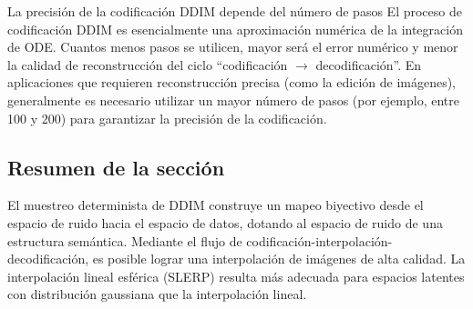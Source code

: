 \begin{warningbox}{La precisión de la codificación DDIM depende del número de pasos}
El proceso de codificación DDIM es esencialmente una aproximación numérica de la integración de ODE. Cuantos menos pasos se utilicen, mayor será el error numérico y menor la calidad de reconstrucción del ciclo ``codificación $\to$ decodificación''. En aplicaciones que requieren reconstrucción precisa (como la edición de imágenes), generalmente es necesario utilizar un mayor número de pasos (por ejemplo, entre 100 y 200) para garantizar la precisión de la codificación.
\end{warningbox}

\subsection{Resumen de la sección}

El muestreo determinista de DDIM construye un mapeo biyectivo desde el espacio de ruido hacia el espacio de datos, dotando al espacio de ruido de una estructura semántica. Mediante el flujo de codificación-interpolación-decodificación, es posible lograr una interpolación de imágenes de alta calidad. La interpolación lineal esférica (SLERP) resulta más adecuada para espacios latentes con distribución gaussiana que la interpolación lineal.
